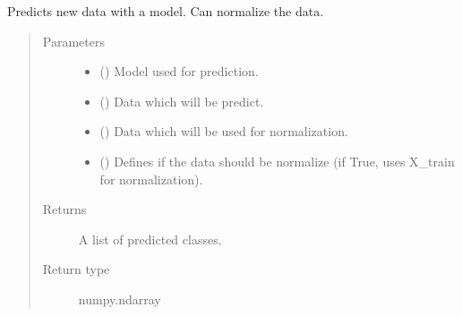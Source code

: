 \documentclass[letterpaper,10pt,english]{sphinxmanual}
\begin{document}
\begin{fulllineitems}
\label{\detokenize{anoog.model:anoog.model.model.predict}}
\sphinxAtStartPar
Predicts new data with a model.
Can normalize the data.
\begin{quote}\begin{description}
\item[{Parameters}] \leavevmode\begin{itemize}
\item {} 
\sphinxAtStartPar
{} () \textendash{} Model used for prediction.

\item {} 
\sphinxAtStartPar
{} () \textendash{} Data which will be predict.

\item {} 
\sphinxAtStartPar
{} () \textendash{} Data which will be used for normalization.

\item {} 
\sphinxAtStartPar
{} (\sphinxstyleliteralemphasis{\sphinxupquote{, }}) \textendash{} Defines if the data should be normalize (if True, uses X\_train for normalization).

\end{itemize}

\item[{Returns}] \leavevmode
\sphinxAtStartPar
A list of predicted classes.

\item[{Return type}] \leavevmode
\sphinxAtStartPar
numpy.ndarray

\end{description}\end{quote}

\end{fulllineitems}
\end{document}
